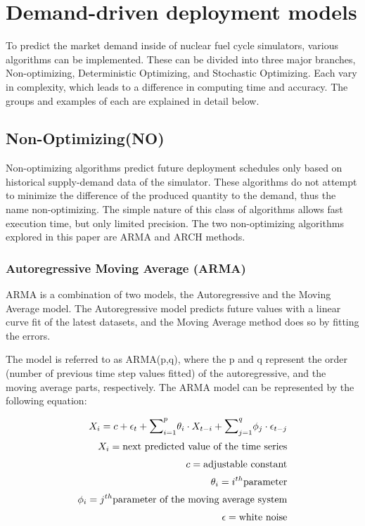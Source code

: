 \section{ Demand-driven deployment models}
To predict the market demand inside of nuclear fuel cycle simulators, various algorithms
can be implemented. These can be divided into three major
branches, Non-optimizing, Deterministic Optimizing, and Stochastic
Optimizing. Each vary in complexity, which leads to a difference
in computing time and accuracy. The groups and examples of each are 
explained in detail below. 

\subsection{Non-Optimizing(NO)}

Non-optimizing algorithms predict future deployment schedules
only based on historical supply-demand data of the simulator. These algorithms do not attempt
to minimize the difference of the produced quantity to the demand,
thus the name non-optimizing. The simple nature of this class of algorithms
allows fast execution time, but only limited precision. The
two non-optimizing algorithms explored in this paper are \gls{ARMA}
and \gls{ARCH} methods. 

\subsubsection{Autoregressive Moving Average (ARMA)}

\gls{ARMA} is a combination of two models, the Autoregressive
and the Moving Average model. The Autoregressive model 
predicts future values with a linear curve fit of the latest
datasets, and the Moving Average method does so by fitting the 
errors. \cite{intro_arma}

The model is referred to as ARMA(p,q), where the p and q represent 
the order (number of previous time step values fitted) of the autoregressive,
and the moving average parts,
respectively. 
The \gls{ARMA} model can be represented by the following equation:

\begin{align} 
	X_i=c + \epsilon_t + {\mathlarger{\sum}}_{i=1}^{p}\theta_i \cdot X_{t-i}+
	 {\mathlarger{\sum}}_{j=1}^{q}\phi_j\cdot\epsilon_{t-j}\\
	X_i= \mbox{next predicted value of the time series}\\
	c= \mbox{adjustable constant}\\
	\theta_i=i^{th} \mbox{parameter}\\
	\phi_i=j^{th} \mbox{parameter of the moving average system}\\
	\epsilon = \mbox{white noise}
\end{align}



